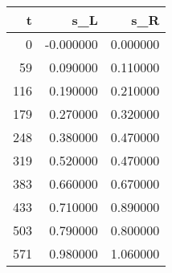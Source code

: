 \begin{tabular}{rrr}
\toprule
t & s_L & s_R \\
\midrule
0 & -0.000000 & 0.000000 \\
59 & 0.090000 & 0.110000 \\
116 & 0.190000 & 0.210000 \\
179 & 0.270000 & 0.320000 \\
248 & 0.380000 & 0.470000 \\
319 & 0.520000 & 0.470000 \\
383 & 0.660000 & 0.670000 \\
433 & 0.710000 & 0.890000 \\
503 & 0.790000 & 0.800000 \\
571 & 0.980000 & 1.060000 \\
\bottomrule
\end{tabular}
